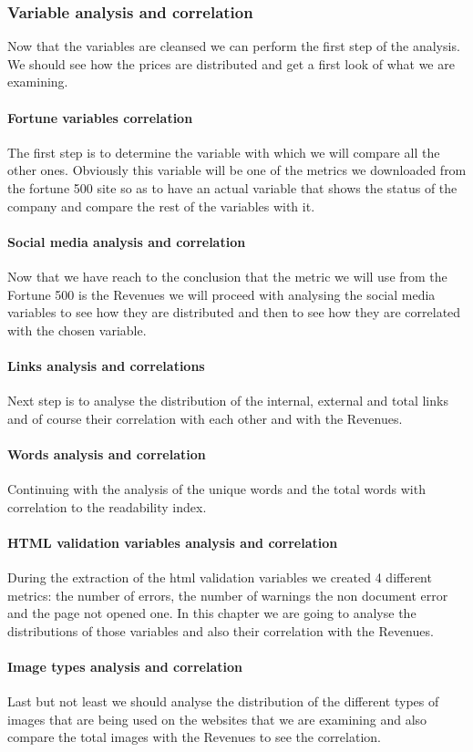 \documentclass{article}
\begin{document}
\subsubsection{Variable analysis and correlation}
Now that the variables are cleansed we can perform the first step of the analysis. We should see how the prices are distributed and get a first look of what we are examining.
\paragraph{Fortune variables correlation}
The first step is to determine the variable with which we will compare all the other ones. Obviously this variable will be one of the metrics we downloaded from the fortune 500 site so as to have an actual variable that shows the status of the company and compare the rest of the variables with it. 
\paragraph{Social media analysis and correlation}
Now that we have reach to the conclusion that the metric we will use from the Fortune 500 is the Revenues we will proceed with analysing the social media variables to see how they are distributed and then to see how they are correlated with the chosen variable.
\paragraph{Links analysis and correlations}
Next step is to analyse the distribution of the internal, external and total links and of course their correlation with each other and with the Revenues.
\paragraph{Words analysis and correlation}
Continuing with the analysis of the unique words and the total words with correlation to the readability index.
\paragraph{HTML validation variables analysis and correlation}
During the extraction of the html validation variables we created 4 different metrics: the number of errors, the number of warnings the non document error and the page not opened one. In this chapter we are going to analyse the distributions of those variables and also their correlation with the Revenues.
\paragraph{Image types analysis and correlation}
Last but not least we should analyse the distribution of the different types of images that are being used on the websites that we are examining and also compare the total images with the Revenues to see the correlation.
\end{document}
